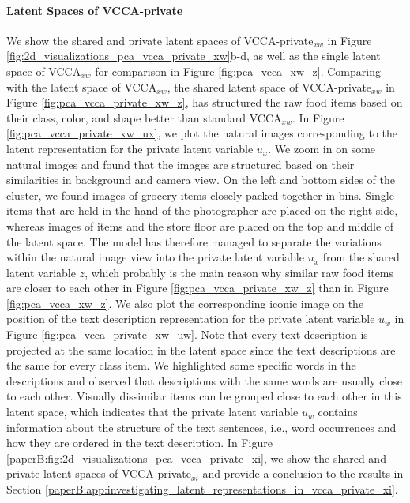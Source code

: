 

\vspace{-3mm}
\paragraph{Latent Spaces of VCCA-private } We show the shared and private latent spaces of VCCA-private$_{x w}$ in Figure \ref{fig:2d_visualizations_pca_vcca_private_xw}b-d, as well as the single latent space of VCCA$_{x w}$ for comparison in Figure \ref{fig:pca_vcca_xw_z}. 
Comparing with the latent space of VCCA$_{x w}$, the shared latent space of VCCA-private$_{x w}$ in Figure \ref{fig:pca_vcca_private_xw_z}, has structured the raw food items based on their class, color, and shape better than standard VCCA$_{x w}$. In Figure \ref{fig:pca_vcca_private_xw_ux}, we plot the natural images corresponding to the latent representation for the private latent variable $u_{x}$. We zoom in on some natural images and found that the images are structured based on their similarities in background and camera view. On the left and bottom sides of the cluster, we found images of grocery items closely packed together in bins. Single items that are held in the hand of the photographer are placed on the right side, whereas images of items and the store floor are placed on the top and middle of the latent space. The model has therefore managed to separate the variations within the natural image view into the private latent variable $u_{x}$ from the shared latent variable $z$, which probably is the main reason why similar raw food items are closer to each other in Figure \ref{fig:pca_vcca_private_xw_z} than in Figure \ref{fig:pca_vcca_xw_z}. We also plot the corresponding iconic image on the position of the text description representation for the private latent variable $u_{w}$ in Figure \ref{fig:pca_vcca_private_xw_uw}. Note that every text description is projected at the same location in the latent space since the text descriptions are the same for every class item. We highlighted some specific words in the descriptions and observed that descriptions with the same words are usually close to each other. Visually dissimilar items can be grouped close to each other in this latent space, which indicates that the private latent variable $u_{w}$ contains information about the structure of the text sentences, i.e., word occurrences and how they are ordered in the text description. 
In Figure \ref{paperB:fig:2d_visualizations_pca_vcca_private_xi}, %
we show the shared and private latent spaces of VCCA-private$_{x i}$ and provide a conclusion to the results in Section \ref{paperB:app:investigating_latent_representations_in_vcca_private_xi}. %

